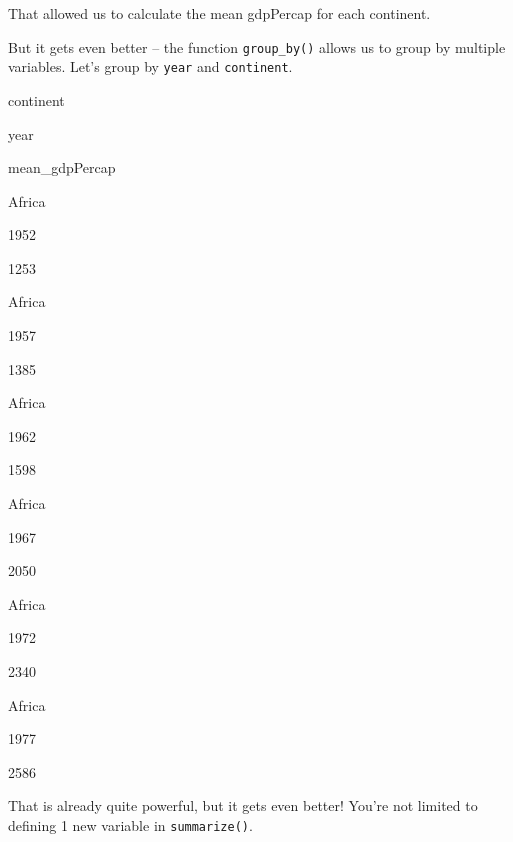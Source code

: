 \documentclass[]{book}
\newenvironment{Shaded}{\begin{snugshade}}{\end{snugshade}}
\newcommand{\DataTypeTok}[1]{\textcolor[rgb]{0.13,0.29,0.53}{#1}}
\newcommand{\KeywordTok}[1]{\textcolor[rgb]{0.13,0.29,0.53}{\textbf{#1}}}
\newcommand{\NormalTok}[1]{#1}
\newcommand{\OperatorTok}[1]{\textcolor[rgb]{0.81,0.36,0.00}{\textbf{#1}}}
\newcommand{\StringTok}[1]{\textcolor[rgb]{0.31,0.60,0.02}{#1}}
\begin{document}
That allowed us to calculate the mean gdpPercap for each continent.

But it gets even better -- the function \texttt{group\_by()} allows us to group by multiple variables. Let's group by \texttt{year} and \texttt{continent}.

\begin{Shaded}
\end{Shaded}

continent

year

mean\_gdpPercap

Africa

1952

1253

Africa

1957

1385

Africa

1962

1598

Africa

1967

2050

Africa

1972

2340

Africa

1977

2586

That is already quite powerful, but it gets even better! You're not limited to defining 1 new variable in \texttt{summarize()}.

\begin{Shaded}
\end{Shaded}
\end{document}
